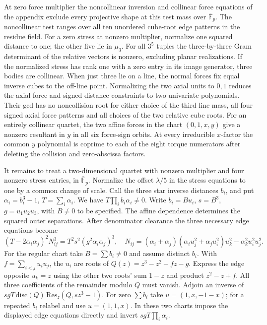 \documentclass[11pt]{article}
\begin{document}
At zero force multiplier the noncollinear inversion and collinear force equations of the appendix exclude every projective shape at this test mass over $\overline{\mathbb F}_p$. The noncollinear test ranges over all ten unordered cube-root edge patterns in the residue field. For a zero stress at nonzero multiplier, normalize one squared distance to one; the other five lie in $\mu_3$. For all $3^5$ tuples the three-by-three Gram determinant of the relative vectors is nonzero, excluding planar realizations. If the normalized stress has rank one with a zero entry in its image generator, three bodies are collinear. When just three lie on a line, the normal forces fix equal inverse cubes to the off-line point. Normalizing the two axial units to $0,1$ reduces the axial force and signed distance constraints to two univariate polynomials. Their gcd has no noncollision root for either choice of the third line mass, all four signed axial force patterns and all choices of the two relative cube roots. For an entirely collinear quartet, the two affine forces in the chart $(0,1,x,y)$ give a nonzero resultant in $y$ in all six force-sign orbits. At every irreducible $x$-factor the common $y$ polynomial is coprime to each of the eight torque numerators after deleting the collision and zero-abscissa factors.

It remains to treat a two-dimensional quartet with nonzero multiplier and four nonzero stress entries, in $\overline{\mathbb F}_p$. Normalize the offset $\lambda/5$ in the stress equations to one by a common change of scale. Call the three star inverse distances $b_i$, and put $\alpha_i=b_i^3-1$, $T=\sum_i\alpha_i$. We have $T\prod_i b_i\alpha_i\ne0$. Write $b_i=B u_i$, $s=B^3$, $g=u_1u_2u_3$, with $B\ne0$ to be specified. The affine dependence determines the squared outer separations. After denominator clearance the three necessary edge equations become
\[
 (T-2\alpha_i\alpha_j)^2N_{ij}^3=T^2s^2(g^2\alpha_i\alpha_j)^3,\quad
 N_{ij}=(\alpha_i+\alpha_j)(\alpha_i u_j^2+\alpha_j u_i^2)u_k^2-
 \alpha_k^2u_i^2u_j^2 .
\]
For the regular chart take $B=\sum b_i\ne0$ and assume distinct $b_i$. With $f=\sum_{i<j}u_i u_j$, the $u_i$ are roots of $Q(z)=z^3-z^2+fz-g$. Express the edge opposite $u_k=z$ using the other two roots' sum $1-z$ and product $z^2-z+f$. All three coefficients of the remainder modulo $Q$ must vanish. Adjoin an inverse of $sgT\,\mathrm{disc}(Q)\,\mathrm{Res}_z(Q,sz^3-1)$. For zero $\sum b_i$ take $u=(1,x,-1-x)$; for a repeated $b_i$ relabel and use $u=(1,1,x)$. In these two charts impose the displayed edge equations directly and invert $sgT\prod_i\alpha_i$.
\end{document}
